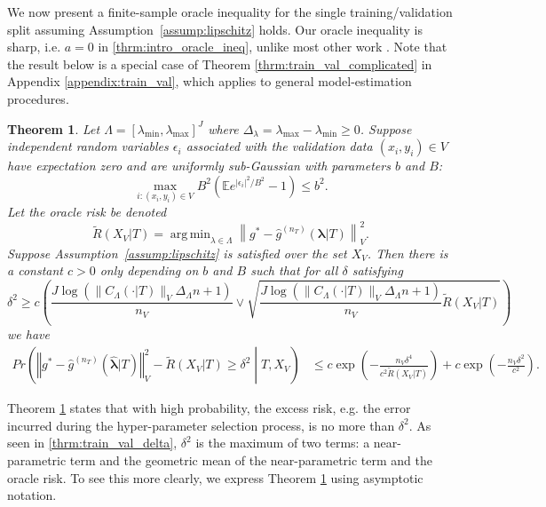 \documentclass[12pt]{article} %
\newtheorem{theorem}{Theorem}
\theoremstyle{definition}
\DeclareMathOperator*{\argmin}{arg\,min}
\begin{document}
We now present a finite-sample oracle inequality for the single training/validation split assuming Assumption~\ref{assump:lipschitz} holds.
Our oracle inequality is sharp, i.e. $a=0$ in \eqref{thrm:intro_oracle_ineq}, unlike most other work \citep{gyorfi2006distribution, lecue2012oracle, van2003unified}.
Note that the result below is a special case of Theorem \ref{thrm:train_val_complicated} in Appendix \ref{appendix:train_val}, which applies to general model-estimation procedures.
\begin{theorem}
	\label{thrm:train_val}
	Let $\Lambda=[\lambda_{\min},\lambda_{\max}]^{J}$ where $\Delta_{\lambda} = \lambda_{\max} - \lambda_{\min} \ge 0$.
	Suppose independent random variables $\epsilon_i$ associated with the validation data $(x_i, y_i) \in V$ have expectation zero and are uniformly sub-Gaussian with parameters $b$ and $B$:
	$$
	\max_{i: (x_i, y_i) \in V} B^2 \left ( \mathbb{E} e^{|\epsilon_i|^2/B^2} - 1 \right ) \le b^2.
	$$
	Let the oracle risk be denoted
	\begin{equation}
	\tilde{R}(X_V|T) = \argmin_{\lambda \in \Lambda} \left \| g^*-\hat{g}^{(n_T)}( \boldsymbol{\lambda} | T) \right \|_{V}^{2}.
	\label{eq:tilde_lambda_def}
	\end{equation}
	Suppose Assumption~\ref{assump:lipschitz} is satisfied over the set $X_V$.
	Then there is a constant $c>0$ only depending on $b$ and $B$ such that for all $\delta$ satisfying
	\begin{equation}
	\delta^{2}
	\ge
	c \left (
	\frac{J \log(\|C_\Lambda(\cdot |T)\|_V \Delta_{\Lambda} n + 1)}{n_{V}}
	\vee 
	\sqrt{\frac{J \log(\|C_\Lambda(\cdot |T)\|_V \Delta_{\Lambda} n + 1)}{n_{V}}
		\tilde{R}(X_V|T)}
	\right )
	\label{thrm:train_val_delta}
	\end{equation}
	we have
	\begin{align}
	Pr\left(
	\left\Vert g^* - \hat{g}^{(n_T)}( \hat{\boldsymbol{\lambda}} | T) \right\Vert _{V}^2 -
	\tilde{R}(X_V|T)
	\ge\delta^2
	\middle | 
	T, X_V
	\right )
	&\le c\exp\left(-\frac{n_{V}\delta^{4}}{c^{2} \tilde{R}(X_V|T)}\right)
	+ c\exp\left(-\frac{n_{V}\delta^{2}}{c^{2}}\right).
	\end{align}
	
\end{theorem}
\noindent
Theorem \ref{thrm:train_val} states that with high probability, the excess risk, e.g. the error incurred during the hyper-parameter selection process, is no more than $\delta^2$.
As seen in \eqref{thrm:train_val_delta}, $\delta^2$ is the maximum of two terms: a near-parametric term and the geometric mean of the near-parametric term and the oracle risk. To see this more clearly, we express Theorem \ref{thrm:train_val} using asymptotic notation.
\end{document}

